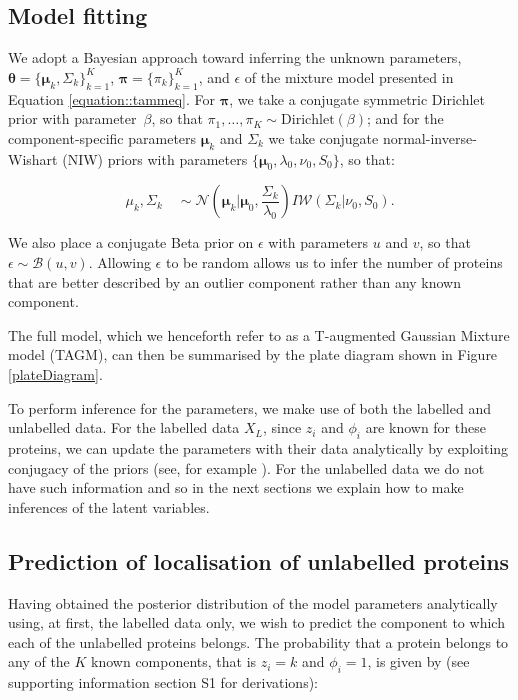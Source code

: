 \documentclass[10pt,letterpaper]{article}\usepackage[]{graphicx}\usepackage[]{color}
\begin{document}
\subsection*{Model fitting}

We adopt a Bayesian approach toward inferring the unknown parameters,
$\boldsymbol{\theta} = \{\boldsymbol{\mu}_k, \Sigma_k \}_{k = 1}^K$,
$\boldsymbol{\pi} = \{\pi_k\}_{k = 1}^K$, and $\epsilon$ of the
mixture model presented in Equation \eqref{equation::tammeq}.  For
$\boldsymbol{\pi}$, we take a conjugate symmetric Dirichlet prior with
parameter~$\beta$, so that
$\pi_1, \ldots, \pi_K \sim \mbox{Dirichlet}(\beta)$; and for the
component-specific parameters $\boldsymbol{\mu}_k$ and $\Sigma_k$ we
take conjugate normal-inverse-Wishart (NIW) priors with parameters
$\{\boldsymbol{\mu}_0, \lambda_0, \nu_0, S_0\}$, so that:

\begin{equation} \label{equation::prior}
  \mu_k, \Sigma_k \quad \sim \mathcal{N}\left(\boldsymbol{\mu}_k|\boldsymbol{\mu}_0, \frac{\Sigma_{k}}{\lambda_0}\right)I\mathcal{W}\left(\Sigma_{k}|\nu_0, S_0\right).
\end{equation}

We also place a conjugate Beta prior on $\epsilon$ with parameters $u$
and $v$, so that $\epsilon \sim \mathcal{B}(u,v)$.  Allowing
$\epsilon$ to be random allows us to infer the number of proteins that
are better described by an outlier component rather than any known
component.

The full model, which we henceforth refer to as a T-augmented Gaussian
Mixture model (TAGM), can then be summarised by the plate diagram
shown in Figure \ref{plateDiagram}.


To perform inference for the parameters, we make use of both the
labelled and unlabelled data. For the labelled data $X_L$, since $z_i$
and $\phi_i$ are known for these proteins, we can update the
parameters with their data analytically by exploiting conjugacy of the
priors (see, for example \cite{Gelman:1995}). For the unlabelled
data we do not have such information and so in the next sections we
explain how to make inferences of the latent variables.

\subsection*{Prediction of localisation of unlabelled proteins}

Having obtained the posterior distribution of the model parameters
analytically using, at first, the labelled data only, we wish to
predict the component to which each of the unlabelled proteins
belongs. The probability that a protein belongs to any of the $K$
known components, that is $z_i = k$ and $\phi_i = 1$, is given by (see
supporting information section S1 for derivations):
\end{document}
